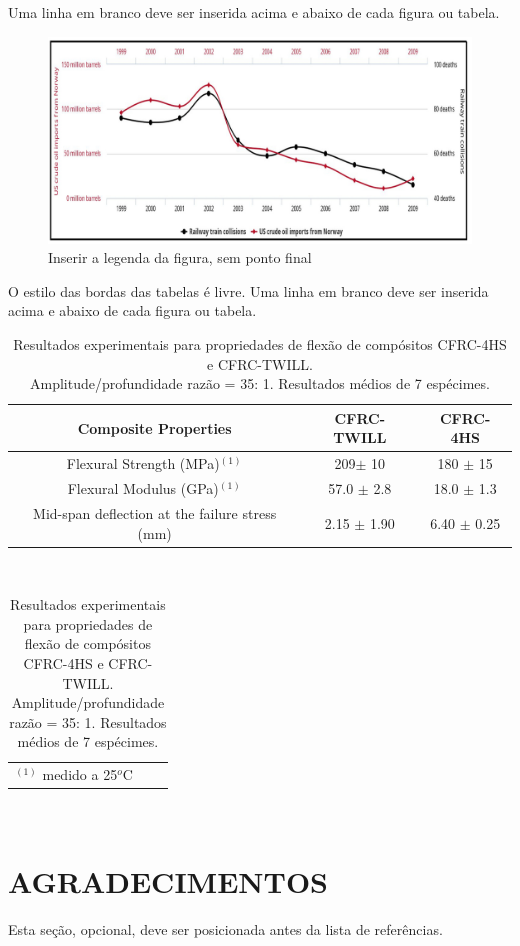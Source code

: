 \documentclass[10pt,fleqn,a4paper,twoside]{article}
\begin{document}
Uma linha em branco deve ser inserida acima e abaixo de cada figura ou tabela. 
\begin{figure}[h!]
\centering
\includegraphics[angle=0, scale=0.250]{figure.jpeg}
\caption{Inserir a legenda da figura, sem ponto final}
\label{fig1}
\end{figure}

O estilo das bordas das tabelas é livre. Uma linha em branco deve ser inserida acima e abaixo de cada figura ou tabela.

\begin{table}[!h]
\centering
\caption{Resultados experimentais para propriedades de flexão de compósitos CFRC-4HS e CFRC-TWILL.  \protect\\Amplitude/profundidade razão = 35: 1. Resultados médios de 7 espécimes.}
\begin{tabular}{|c|c|c|}
\hline
Composite Properties & CFRC-TWILL & CFRC-4HS\\
\hline
Flexural Strength (MPa)$^{(1)}$ & 209$\pm$ 10 & 180 $\pm$  15\\
\hline
Flexural Modulus (GPa)$^{(1)}$ & 57.0 $\pm$ 2.8 & 18.0 $\pm$  1.3\\
\hline
Mid-span deflection at the failure stress (mm) & 2.15 $\pm$  1.90 & 6.40 $\pm$  0.25\\
\hline
\end{tabular}
\\
\begin{tabular}{p{11cm}ll}
$^{(1)}$ medido a 25$^{o}$C & &
\end{tabular}
\
\label{tab1}
\end{table}

\section{AGRADECIMENTOS}
Esta seção, opcional, deve ser posicionada antes da lista de referências.
\end{document}
